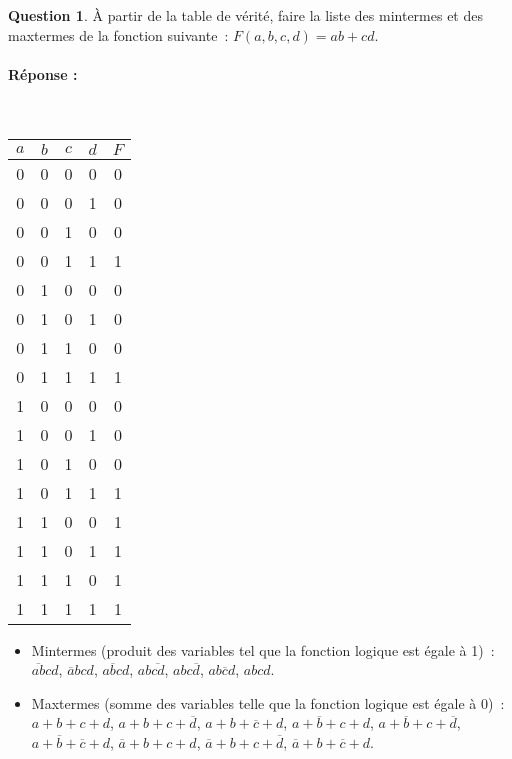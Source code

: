 \documentclass[11pt,a4paper]{article}
\theoremstyle{definition}%
\newtheorem{Q}{Question}[] %
\newcommand{\reponse}[1]{%
	\ifthenelse {\boolean{corrige}} {\paragraph{Réponse :} \color{darkblue}   #1\color{black}} {}
 }
\begin{document}
\begin{Q}
À partir de la table de vérité, faire la liste des mintermes et des maxtermes de la fonction suivante~: $F(a,b,c,d) = ab + cd$.
\reponse{~\\
	\begin{tabular}{|c|c|c|c|c|} \hline
	$a$ & $b$ & $c$ & $d$ & $F$ \\ \hline
	0 & 0 & 0 & 0 & 0 \\ \hline
	0 & 0 & 0 & 1 & 0 \\ \hline
	0 & 0 & 1 & 0 & 0 \\ \hline
	0 & 0 & 1 & 1 & 1 \\ \hline
	0 & 1 & 0 & 0 & 0 \\ \hline
	0 & 1 & 0 & 1 & 0 \\ \hline
	0 & 1 & 1 & 0 & 0 \\ \hline
	0 & 1 & 1 & 1 & 1 \\ \hline
	1 & 0 & 0 & 0 & 0 \\ \hline
	1 & 0 & 0 & 1 & 0 \\ \hline
	1 & 0 & 1 & 0 & 0 \\ \hline
	1 & 0 & 1 & 1 & 1 \\ \hline
	1 & 1 & 0 & 0 & 1 \\ \hline
	1 & 1 & 0 & 1 & 1 \\ \hline
	1 & 1 & 1 & 0 & 1 \\ \hline
	1 & 1 & 1 & 1 & 1 \\ \hline
	\end{tabular}

	\begin{itemize}
		\item Mintermes (produit des variables tel que la fonction logique est égale à 1)~: $\overline{ab}cd$, $\overline{a}bcd$, $a\overline{b}cd$, $ab\overline{cd}$, $abc\overline{d}$, $ab\overline{c}d$, $abcd$.

		\item Maxtermes (somme des variables telle que la fonction logique est égale à 0)~:	$a + b + c + d$, $a + b + c + \overline{d}$, $a + b + \overline{c} + d$, $a + \overline{b} + c + d$, $a + \overline{b} + c + \overline{d}$, $a + \overline{b} + \overline{c} + d$, $\overline{a} + b + c + d$, $\overline{a} + b + c + \overline{d}$, $\overline{a} + b + \overline{c} + d$.
	\end{itemize}

}
\end{Q}
\end{document}
